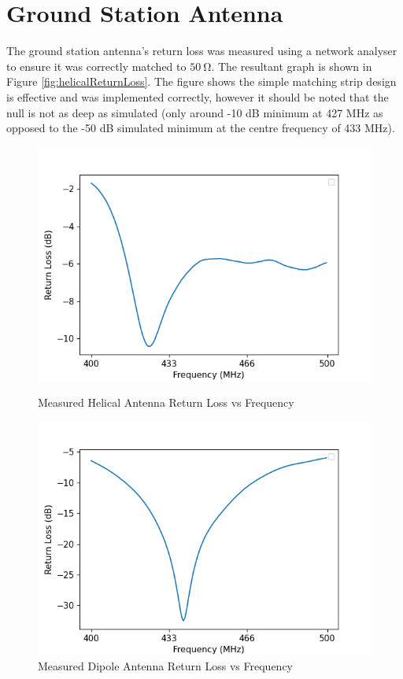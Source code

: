 \graphicspath{{./figures}}

\section{Ground Station Antenna}

The ground station antenna's return loss was measured using a network analyser to ensure it was correctly matched to $\SI{50}{\ohm}$. The resultant graph is shown in Figure \ref{fig:helicalReturnLoss}. The figure shows the simple matching strip design is effective and was implemented correctly, however it should be noted that the null is not as deep as simulated (only around -10 dB minimum at 427 MHz as opposed to the -50 dB simulated minimum at the centre frequency of 433 MHz).


\begin{figure}[!htb]
  \begin{minipage}{.49\textwidth}
    \centering
    \includegraphics[width=1.1\linewidth]{helicalReturnLoss}
    \caption{Measured Helical Antenna Return Loss vs Frequency}
    \label{fig:helicalReturnLoss}
  \end{minipage}
  \begin{minipage}{.49\textwidth}
    \centering
    \includegraphics[width=1.1\linewidth]{dipoleReturnLoss}
    \caption{Measured Dipole Antenna Return Loss vs Frequency}
    \label{fig:dipoleReturnLoss}
  \end{minipage}
\end{figure}

